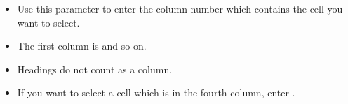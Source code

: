  \begin{itemize}
\item Use this parameter to enter the column number which contains the cell you want to select.
\item The first column is  and so on.
\item Headings do not count as a column.
\item If you want to select a  cell which is in the fourth column, enter . 

\end{itemize}   
